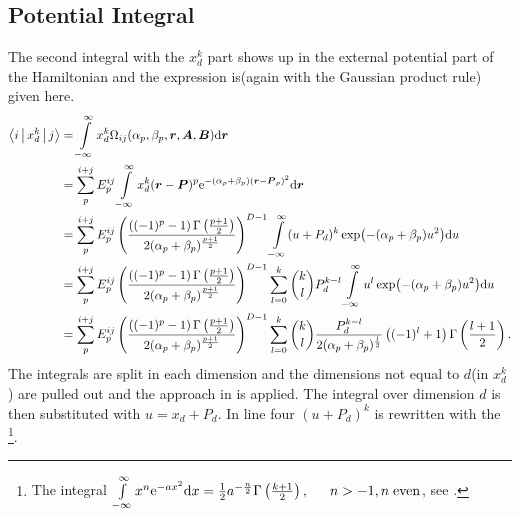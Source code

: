 \subsection{Potential Integral}
    The second integral with the $x^k_d$ part shows up in the external
    potential part of the Hamiltonian and the expression is(again with the
    Gaussian product rule) given here.
        \begin{align}
            \Braket{i|x^k_d|j} &= \int\limits^{\infty}_{-\infty} x^{k}_d
            \Omega_{ij}(\alpha_p,\beta_p,\boldsymbol{{r}},\boldsymbol{{A}},\boldsymbol{{B}}) \mathrm{d}
            \boldsymbol{{r}} \nonumber \\
            &= \sum\limits^{i+j}_{p} E^{ij}_{p} \int\limits^{\infty}_{-\infty} x^k_d (\boldsymbol{{r}}-\boldsymbol{{P}})^p
            \mathrm{e}^{-(\alpha_p+\beta_p)(\boldsymbol{{r}} - \boldsymbol{{P}}_p)^2} \mathrm{d} \boldsymbol{{r}}
            \nonumber \\
            &= \sum\limits^{i+j}_{p} E^{ij}_{p}
            \left(\frac{\left((-1)^p-1\right)\Gamma\left(\frac{p+1}{2}\right)}
            {2(\alpha_p+\beta_p)^{\frac{p+1}{2}}}\right)^{D-1} \int\limits^{\infty}_{-\infty}
            (u+P_d)^k\exp(-(\alpha_p+\beta_p)u^2) \mathrm{d} u \nonumber \\
            &= \sum\limits^{i+j}_{p} E^{ij}_{p}
            \left(\frac{\left((-1)^p-1\right)\Gamma\left(\frac{p+1}{2}\right)}
            {2(\alpha_p+\beta_p)^{\frac{p+1}{2}}}\right)^{D-1}
            \sum\limits_{l=0}^k {k\choose l} P^{k-l}_d \int\limits^{\infty}_{-\infty}
            u^l\exp(-(\alpha_p+\beta_p)u^2) \mathrm{d} u \nonumber \\
            &= \sum\limits^{i+j}_{p} E^{ij}_{p}
            \left(\frac{\left((-1)^p-1\right)\Gamma\left(\frac{p+1}{2}\right)}
            {2(\alpha_p+\beta_p)^{\frac{p+1}{2}}}\right)^{D-1}
            \sum\limits_{l=0}^k {k\choose l}
            \frac{P^{k-l}_d}{2(\alpha_p+\beta_p)^{\frac{l}{2}}}
            \left((-1)^l+1\right) \Gamma\left(\frac{l+1}{2}\right).
            \label{eq:potIntegral}
        \end{align}
    The integrals are split in each dimension and the dimensions not equal to
    $d$(in $x^k_d$) are pulled out and the approach in  is
    applied. The integral over dimension $d$ is then substituted with
    $u=x_d+P_d$. In line four $(u+P_d)^k$ is rewritten with the \footnote{The integral $\infint x^n\me^{-ax^2}\md x =
    \frac{1}{2}a^{-\frac{n}{2}}\Gamma\left(\frac{k+1}{2}\right),\indent n>-1,
    n\;\text{even}$, see \cite{handbookmath}.}.

